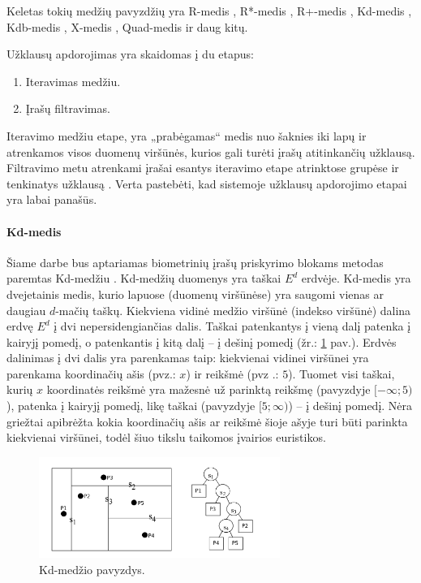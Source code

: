 Keletas tokių medžių pavyzdžių yra R-medis \cite{guttman1984r}, R*-medis \cite{beckmann1990r}, R+-medis \cite{sellis1987r+}, Kd-medis \cite{bentley1979multidimensional}, Kdb-medis \cite{robinson1981kdb}, X-medis \cite{berchtold1996x}, Quad-medis \cite{habenicht1983quad} ir daug kitų.

Užklausų apdorojimas yra skaidomas į du etapus:
\begin{enumerate}
	\item Iteravimas medžiu.
	\item Įrašų filtravimas.
\end{enumerate}
Iteravimo medžiu etape, yra „prabėgamas“ medis nuo šaknies iki lapų ir atrenkamos visos duomenų viršūnės, kurios gali turėti įrašų atitinkančių užklausą.
Filtravimo metu atrenkami įrašai esantys iteravimo etape atrinktose grupėse ir tenkinatys užklausą \cite{brinkhoff1994multi} \cite{bohm2001searching}.
Verta pastebėti, kad sistemoje \cite{NeurotechnologyMegamatcherAccelerator} užklausų apdorojimo etapai yra labai panašūs.

\paragraph{Kd-medis}
\label{sec:Kd-tree}

Šiame darbe bus aptariamas biometrinių įrašų priskyrimo blokams metodas paremtas Kd-medžiu \cite{bentley1979multidimensional}.
Kd-medžių duomenys yra taškai $E^d$ erdvėje.
Kd-medis yra dvejetainis medis, kurio lapuose (duomenų viršūnėse) yra saugomi vienas ar daugiau $d$-mačių taškų.
Kiekviena vidinė medžio viršūnė (indekso viršūnė) dalina erdvę $E^d$ į dvi nepersidengiančias dalis.
Taškai patenkantys į vieną dalį patenka į kairyjį pomedį, o patenkantis į kitą dalį -- į dešinį pomedį (žr.: \ref{img:KdTreeExample} pav.).
Erdvės dalinimas į dvi dalis yra parenkamas taip: kiekvienai vidinei viršūnei yra parenkama koordinačių ašis (pvz.: $x$) ir reikšmė (pvz .: $5$).
Tuomet visi taškai, kurių $x$ koordinatės reikšmė yra mažesnė už parinktą reikšmę (pavyzdyje $[-\infty; 5)$), patenka į kairyjį pomedį, likę taškai (pavyzdyje $[5; \infty)$) -- į dešinį pomedį.
Nėra griežtai apibrėžta kokia koordinačių ašis ar reikšmė šioje ašyje turi būti parinkta kiekvienai viršūnei, todėl šiuo tikslu taikomos įvairios euristikos.

\begin{figure}[H]
\begin{center}
\includegraphics[width=0.7\textwidth]{img/KdTreeExample.png}
\caption{Kd-medžio pavyzdys.}
\label{img:KdTreeExample}
\end{center}
\end{figure}

